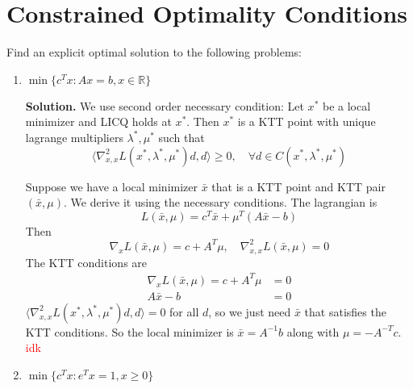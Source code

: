 \documentclass{article}
\begin{document}
\section{Constrained Optimality Conditions}
Find an explicit optimal solution to the following problems:
\begin{enumerate}
    \item $\min\{c^Tx : Ax = b, x \in \mathbb R\}$
    
    \textbf{Solution.} We use second order necessary condition: Let $x^*$ be a local minimizer and LICQ holds at $x^*$. Then $x^*$ is a KTT point with unique lagrange multipliers $\lambda^*, \mu^*$ such that $$\langle \nabla^2_{x, x} L(x^*, \lambda^*, \mu^*)d, d \rangle \geq 0, \quad \forall d \in C(x^*, \lambda^*, \mu^*)$$

    \bigskip
    Suppose we have a local minimizer $\bar x$ that is a KTT point and KTT pair $(\bar x, \mu)$. We derive it using the necessary conditions. The lagrangian is $$L(\bar x, \mu) = c^T\bar x + \mu^T(A\bar x - b)$$
    Then $$\nabla_x L(\bar x, \mu) = c + A^T\mu, \quad \nabla^2_{x, x} L(\bar x, \mu) = 0$$ The KTT conditions are 
    \begin{align*}
        \nabla_x L(\bar x, \mu) = c + A^T\mu &= 0 \\
        A\bar x - b &= 0
    \end{align*}
    $\langle \nabla^2_{x, x} L(x^*, \lambda^*, \mu^*)d, d \rangle = 0$ for all $d$, so we just need $\bar x$ that satisfies the KTT conditions. So the local minimizer is $\bar x = A^{-1}b$ along with $\mu = -A^{-T}c$. \textcolor{red}{idk}
    \item $\min\{c^Tx : e^Tx = 1, x \geq 0\}$
\end{enumerate}
\end{document}
